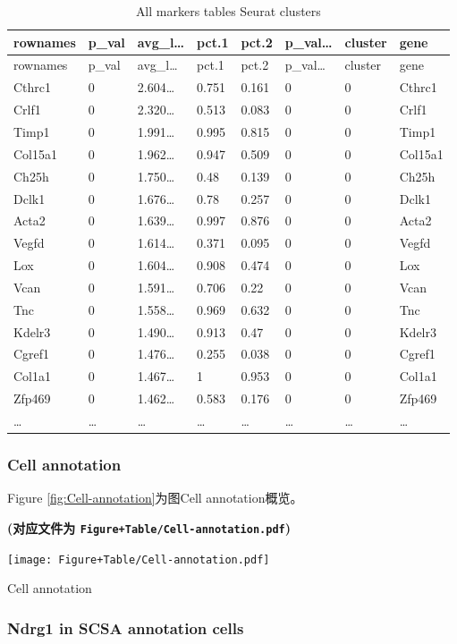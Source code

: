\documentclass[
]{article}
\begin{document}
\begin{longtable}[]{@{}llllllll@{}}
\caption{\label{tab:All-markers-tables-Seurat-clusters}All markers tables Seurat clusters}\tabularnewline
\toprule
rownames & p\_val & avg\_l\ldots{} & pct.1 & pct.2 & p\_val\ldots{} & cluster & gene\tabularnewline
\midrule
\endfirsthead
\toprule
rownames & p\_val & avg\_l\ldots{} & pct.1 & pct.2 & p\_val\ldots{} & cluster & gene\tabularnewline
\midrule
\endhead
Cthrc1 & 0 & 2.604\ldots{} & 0.751 & 0.161 & 0 & 0 & Cthrc1\tabularnewline
Crlf1 & 0 & 2.320\ldots{} & 0.513 & 0.083 & 0 & 0 & Crlf1\tabularnewline
Timp1 & 0 & 1.991\ldots{} & 0.995 & 0.815 & 0 & 0 & Timp1\tabularnewline
Col15a1 & 0 & 1.962\ldots{} & 0.947 & 0.509 & 0 & 0 & Col15a1\tabularnewline
Ch25h & 0 & 1.750\ldots{} & 0.48 & 0.139 & 0 & 0 & Ch25h\tabularnewline
Dclk1 & 0 & 1.676\ldots{} & 0.78 & 0.257 & 0 & 0 & Dclk1\tabularnewline
Acta2 & 0 & 1.639\ldots{} & 0.997 & 0.876 & 0 & 0 & Acta2\tabularnewline
Vegfd & 0 & 1.614\ldots{} & 0.371 & 0.095 & 0 & 0 & Vegfd\tabularnewline
Lox & 0 & 1.604\ldots{} & 0.908 & 0.474 & 0 & 0 & Lox\tabularnewline
Vcan & 0 & 1.591\ldots{} & 0.706 & 0.22 & 0 & 0 & Vcan\tabularnewline
Tnc & 0 & 1.558\ldots{} & 0.969 & 0.632 & 0 & 0 & Tnc\tabularnewline
Kdelr3 & 0 & 1.490\ldots{} & 0.913 & 0.47 & 0 & 0 & Kdelr3\tabularnewline
Cgref1 & 0 & 1.476\ldots{} & 0.255 & 0.038 & 0 & 0 & Cgref1\tabularnewline
Col1a1 & 0 & 1.467\ldots{} & 1 & 0.953 & 0 & 0 & Col1a1\tabularnewline
Zfp469 & 0 & 1.462\ldots{} & 0.583 & 0.176 & 0 & 0 & Zfp469\tabularnewline
\ldots{} & \ldots{} & \ldots{} & \ldots{} & \ldots{} & \ldots{} & \ldots{} & \ldots{}\tabularnewline
\bottomrule
\end{longtable}

\hypertarget{cell-annotation}{%
\subsubsection{Cell annotation}\label{cell-annotation}}

Figure \ref{fig:Cell-annotation}为图Cell annotation概览。

\textbf{(对应文件为 \texttt{Figure+Table/Cell-annotation.pdf})}

\def\@captype{figure}
\begin{center}
\texttt{[image: Figure+Table/Cell-annotation.pdf]}
\caption{Cell annotation}\label{fig:Cell-annotation}
\end{center}

\hypertarget{ndrg1-in-scsa-annotation-cells}{%
\subsubsection{Ndrg1 in SCSA annotation cells}\label{ndrg1-in-scsa-annotation-cells}}
\end{document}
